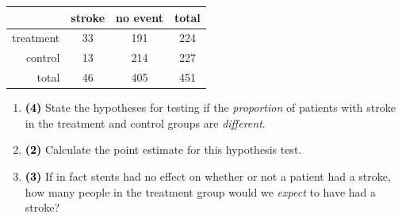 \documentclass[11pt]{article}
\newcommand{\soln}[1]{ \vspace{1.35cm} }
\newcommand{\pts}[1]{ \textbf{{\footnotesize \textcolor{black}{(#1)}}} }	%
\begin{document}
\begin{enumerate}
\begin{center}
\begin{tabular}{r c c | c }
  \hline
 			& stroke		 & no event		& total \\ 
  \hline
treatment	 	& 33 			& 191 			& 224 \\ 
control	 	& 13			& 214 			& 227 \\ 
   \hline
total			& 46			& 405			& 451 \\
   \hline
\end{tabular}
\end{center}

\vspace{0.25cm}

\begin{enumerate}

\item \pts{4} State the hypotheses for testing if the \emph{proportion} of patients with stroke in the treatment and control groups are \emph{different}.

\soln{$H_0: p_T = p_C$ \\
$H_A: p_T \ne p_C$
}

\item \pts{2} Calculate the point estimate for this hypothesis test.

\soln{$\hat{p}_T - \hat{p}_C = \frac{33}{224} - \frac{13}{227} = 0.1473 - 0.0573 = 0.09$}

\item \pts{3} If in fact stents had no effect on whether or not a patient had a stroke, how many people in the treatment group would we \emph{expect} to have had a stroke?

\soln{$E_{T,stroke} = \frac{row~total * column~total}{grand~total} = \frac{46 * 224}{451} = 22.85$}
$\:$


\end{enumerate}
\end{enumerate}
\end{document}
